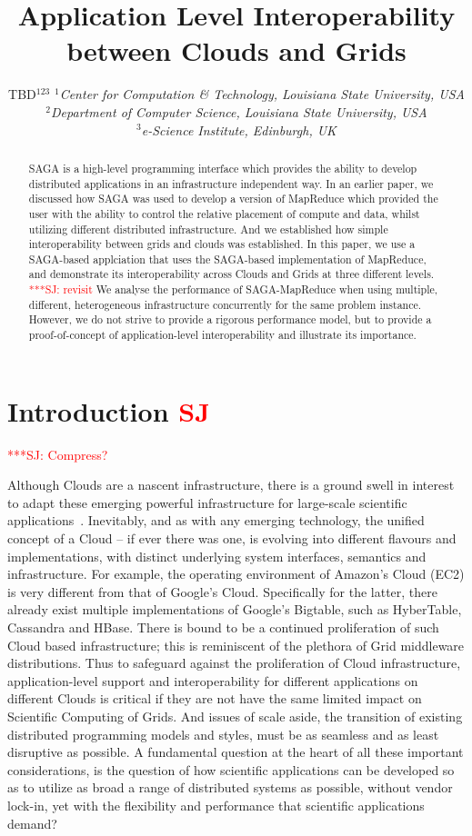 \documentclass[3p,twocolumn]{elsarticle}
\title{Application Level Interoperability between Clouds and Grids}
\author{TBD$^{123}$
  \small{\emph{$^{1}$Center for Computation \& Technology, Louisiana
      State University, USA}}\\
  \small{\emph{$^{2}$Department of Computer Science, Louisiana State
      University, USA}}\\
  \small{\emph{$^{3}$e-Science Institute, Edinburgh, UK}}\\
}
\newcommand{\jhanote}[1]{ {\textcolor{red} { ***SJ: #1 }}}
\newcommand{\jhanote}[1]{}
\newcommand{\sagamapreduce }{SAGA-MapReduce }
\begin{document}
\maketitle

\begin{abstract}
  SAGA is a high-level programming interface which provides the
  ability to develop distributed applications in an infrastructure
  independent way. In an earlier paper, we discussed how SAGA was used
  to develop a version of MapReduce which provided the user with the
  ability to control the relative placement of compute and data,
  whilst utilizing different distributed infrastructure. And we
  established how simple interoperability between grids and clouds was
  established. In this paper, we use a SAGA-based applciation that
  uses the SAGA-based implementation of MapReduce, and demonstrate its
  interoperability across Clouds and Grids at three different levels.
  \jhanote{revisit} We analyse the performance of \sagamapreduce when
  using multiple, different, heterogeneous infrastructure concurrently
  for the same problem instance. However, we do not strive to provide
  a rigorous performance model, but to provide a proof-of-concept of
  application-level interoperability and illustrate its importance.
\end{abstract}

\section{Introduction \textcolor{red}{SJ}}

\jhanote{Compress?}

Although Clouds are a nascent infrastructure, there is a ground swell
in interest to adapt these emerging powerful infrastructure for
large-scale scientific applications~\cite{montagecloud}. Inevitably,
and as with any emerging technology, the unified concept of a Cloud --
if ever there was one, is evolving into different flavours and
implementations, with distinct underlying system interfaces, semantics
and infrastructure. For example, the operating environment of Amazon's
Cloud (EC2) is very different from that of Google's
Cloud. Specifically for the latter, there already exist multiple
implementations of Google's Bigtable, such as HyberTable, Cassandra
and HBase. There is bound to be a continued proliferation of such
Cloud based infrastructure; this is reminiscent of the plethora of
Grid middleware distributions. Thus to safeguard against the
proliferation of Cloud infrastructure, application-level support and
interoperability for different applications on different Clouds is
critical if they are not have the same limited impact on Scientific
Computing of Grids. And issues of scale aside, the transition of
existing distributed programming models and styles, must be as
seamless and as least disruptive as possible.  A fundamental question
at the heart of all these important considerations, is the question of
how scientific applications can be developed so as to utilize as broad
a range of distributed systems as possible, without vendor lock-in,
yet with the flexibility and performance that scientific applications
demand?
\end{document}
